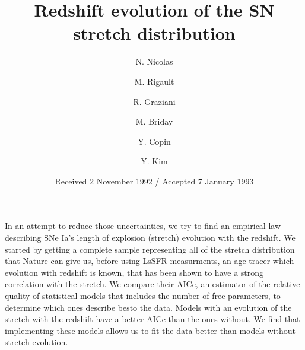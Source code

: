 \documentclass[bibnumber]{aa}
\begin{document}
\title{Redshift evolution of the SN stretch distribution}


\author{N. Nicolas
    \and M. Rigault
    \and R. Graziani     
    \and M. Briday
    \and Y. Copin    
    \and Y. Kim
}



\date{Received 2 November 1992 / Accepted 7 January 1993}

    {In an attempt to reduce those uncertainties, we try to find an empirical
    law describing SNe Ia's length of explosion (stretch) evolution with the
redshift.}
    {We started by getting a complete sample representing all of the stretch
        distribution that Nature can give us, before using LsSFR measurments, an
        age tracer which evolution with redshift is known, that has been shown
        to have a strong correlation with the stretch. We compare their AICc, an
    estimator of the relative quality of statistical models that includes the
number of free parameters, to determine which ones describe besto the data.}
    {Models with an evolution of the stretch with the redshift have a better
    AICc than the ones without.}
    {We find that implementing these models allows us to fit the data better
    than models without stretch evolution.}

\maketitle
\end{document}
